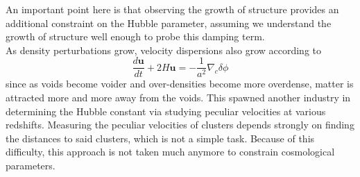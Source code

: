 \documentclass[10pt]{article}
\numberwithin{equation}{section}
\newcommand{\n}{\noindent}
\begin{document}
	\n An important point here is that observing the growth of structure provides an additional constraint on the Hubble parameter, assuming we understand the growth of structure well enough to probe this damping term.\\
	
	\n As density perturbations grow, velocity dispersions also grow according to
	\begin{equation}
		\label{eq:struc5} \frac{d\mathbf{u}}{dt} + 2H\mathbf{u} = -\frac{1}{a^2}\nabla_c\delta\phi
	\end{equation}
	since as voids become voider and over-densities become more overdense, matter is attracted more and more away from the voids. This spawned another industry in determining the Hubble constant via studying peculiar velocities at various redshifts. Measuring the peculiar velocities of clusters depends strongly on finding the distances to said clusters, which is not a simple task. Because of this difficulty, this approach is not taken much anymore to constrain cosmological parameters.
\end{document}
